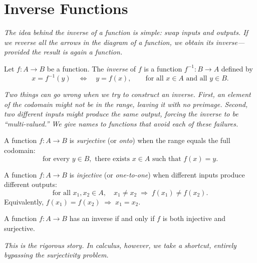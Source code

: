 \section{Inverse Functions}
\label{sec:4.2}

\textit{The idea behind the inverse of a function is simple: swap inputs and outputs.  If we reverse all the arrows in the diagram of a function, we obtain its inverse---provided the result is again a function.}

\begin{definition}
\label{def:4-3}
Let $f\colon A \to B$ be a function.  The \emph{inverse} of $f$ is a function $f^{-1}\colon B \to A$ defined by
\[
  x = f^{-1}(y) \quad \Longleftrightarrow \quad y = f(x),
  \qquad \text{for all } x \in A \text{ and all } y \in B.
\]
\end{definition}

\textit{Two things can go wrong when we try to construct an inverse.  First, an element of the codomain might not be in the range, leaving it with no preimage.  Second, two different inputs might produce the same output, forcing the inverse to be ``multi-valued.''  We give names to functions that avoid each of these failures.}

\begin{definition}[Surjective]
\label{def:4-4}
A function $f\colon A \to B$ is \emph{surjective} (or \emph{onto}) when the range equals the full codomain:
\[
  \text{for every } y \in B, \text{ there exists } x \in A \text{ such that } f(x) = y.
\]
\end{definition}

\begin{definition}[Injective]
\label{def:4-5}
A function $f\colon A \to B$ is \emph{injective} (or \emph{one-to-one}) when different inputs produce different outputs:
\[
  \text{for all } x_1, x_2 \in A, \quad x_1 \neq x_2 \;\Longrightarrow\; f(x_1) \neq f(x_2).
\]
Equivalently, $f(x_1) = f(x_2) \;\Longrightarrow\; x_1 = x_2$.
\end{definition}

\begin{theorem}
\label{thm:4-1}
A function $f\colon A \to B$ has an inverse if and only if $f$ is both injective and surjective.
\end{theorem}

\textit{This is the rigorous story.  In calculus, however, we take a shortcut, entirely bypassing the surjectivity problem.}

